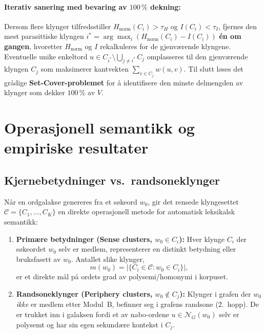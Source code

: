 \documentclass[11pt,a4paper]{article}
\begin{document}
\paragraph{Iterativ sanering med bevaring av $100\,\%$ dekning:}
Dersom flere klynger tilfredsstiller $H_{\text{norm}}(C_i) > \tau_H$ og $I(C_i) < \tau_I$, fjernes den mest parasittiske klyngen $i^* = \arg\max_i (H_{\text{norm}}(C_i) - I(C_i))$ \textbf{én om gangen}, hvoretter $H_{\text{norm}}$ og $I$ rekalkuleres for de gjenværende klyngene. Eventuelle unike enkeltord $u \in C_{i^*} \setminus \bigcup_{j \ne i^*} C_j$ omplasseres til den gjenværende klyngen $C_j$ som maksimerer kantvekten $\sum_{v \in C_j} w(u, v)$. Til slutt løses det grådige \textbf{Set-Cover-problemet} \cite{chvatal1979greedy} for å identifisere den minste delmengden av klynger som dekker $100\,\%$ av $V$.

\section{Operasjonell semantikk og empiriske resultater}

\subsection{Kjernebetydninger vs.\ randsoneklynger}
Når en ordgalakse genereres fra et søkeord $w_0$, gir det rensede klyngesettet $\mathcal{C} = \{C_1, \dots, C_K\}$ en direkte operasjonell metode for automatisk leksikalsk semantikk:
\begin{enumerate}[label=\arabic*.]
  \item \textbf{Primære betydninger (Sense clusters, $w_0 \in C_i$):} Hver klynge $C_i$ der søkeordet $w_0$ selv er medlem, representerer en distinkt betydning eller bruksfasett av $w_0$. Antallet slike klynger,
    \[
      m(w_0) = \big|\{C_i \in \mathcal{C} : w_0 \in C_i\}\big|,
    \]
    er et direkte mål på ordets grad av polysemi/homonymi i korpuset.
  \item \textbf{Randsoneklynger (Periphery clusters, $w_0 \notin C_j$):} Klynger i grafen der $w_0$ \emph{ikke} er medlem etter Modul~B, befinner seg i grafens randsone (2.\ hopp). De er trukket inn i galaksen fordi et av nabo-ordene $u \in \mathcal{N}_G(w_0)$ selv er polysemt og har sin egen sekundære kontekst i $C_j$.
\end{enumerate}
\end{document}
